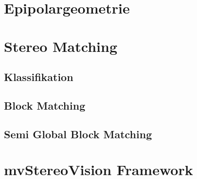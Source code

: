 \section{Epipolargeometrie}
\label{sec:epipolargeometrie}


\section{Stereo Matching}
\label{sec:stereo_matching}

\subsection{Klassifikation}
\label{subsec:stereo_matching_classification}

\subsection{Block Matching}
\label{subsec:stereo_matching_bm}

\subsection{Semi Global Block Matching}
\label{subsec:stereo_matching_sgbm}


\section{mvStereoVision Framework}
\label{sec:framework}
